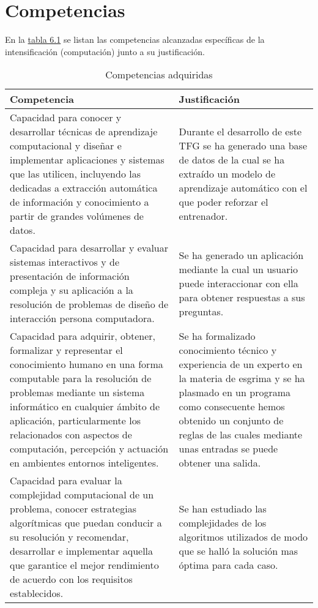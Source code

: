 \section{Competencias}
En la \hyperref[tab:competencias adquiridas]{tabla 6.1} se listan las competencias alcanzadas específicas de la intensificación
(computación) junto a su justificación.

\begin{longtable}{p{} p{}}
  \caption{Competencias adquiridas}
  \label{tab:competencias adquiridas}

  \endfirsthead
  \endhead

  \textbf{Competencia} & \textbf{Justificación} \\
  \hline
  \rowcolor[HTML]{D6D6D6}
  Capacidad para conocer y desarrollar técnicas de aprendizaje computacional y diseñar e implementar aplicaciones y sistemas que las utilicen, incluyendo las dedicadas a extracción automática de información y conocimiento a partir de grandes volúmenes de datos. & Durante el desarrollo de este TFG se ha generado una base de datos de la cual se ha extraído un modelo de aprendizaje automático con el que poder reforzar el entrenador.\\

  Capacidad para desarrollar y evaluar sistemas interactivos y de presentación de información compleja y su aplicación a la resolución de problemas de diseño de interacción persona computadora. & Se ha generado un aplicación mediante la cual un usuario puede interaccionar con ella para obtener respuestas a sus preguntas.\\

  \rowcolor[HTML]{D6D6D6}
  Capacidad para adquirir, obtener, formalizar y representar el conocimiento humano en una forma computable para la resolución de problemas mediante un sistema informático en cualquier ámbito de aplicación, particularmente los relacionados con aspectos de computación, percepción y actuación en ambientes entornos inteligentes. &  Se ha formalizado conocimiento técnico y experiencia de un experto en la materia de esgrima y se ha plasmado en un programa como consecuente hemos obtenido un conjunto de reglas de las cuales mediante unas entradas se puede obtener una salida.  \\

  Capacidad para evaluar la complejidad computacional de un problema, conocer estrategias algorítmicas que puedan conducir a su resolución y recomendar, desarrollar e implementar aquella que garantice el mejor rendimiento de acuerdo con los requisitos establecidos. & Se han estudiado las complejidades de los algoritmos utilizados de modo que se halló la solución mas óptima para cada caso. \\

  \hline
\end{longtable}




